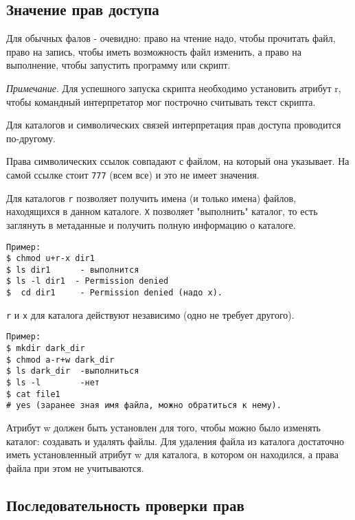 \subsection{Значение прав доступа}

Для обычных фалов - очевидно: право на чтение надо, чтобы прочитать файл, право на запись, чтобы иметь возможность файл изменить, а право на выполнение, чтобы запустить программу или скрипт.

\emph{Примечание}. Для успешного запуска скрипта необходимо установить атрибут r, чтобы командный интерпретатор мог построчно считывать текст скрипта.

Для каталогов и символических связей интерпретация прав доступа проводится по-другому.

Права символических ссылок совпадают с файлом, на который она указывает. На самой ссылке стоит \verb+777+ (всем все) и это не имеет значения. 

Для каталогов \verb+r+ позволяет получить имена (и только имена) файлов, находящихся в данном каталоге. \verb+X+ позволяет "выполнить" каталог, то есть заглянуть в метаданные  и получить полную информацию о каталоге.
\begin{verbatim}
Пример:  
$ chmod u+r-x dir1
$ ls dir1      - выполнится
$ ls -l dir1  - Permission denied
$  cd dir1     - Permission denied (надо х).
\end{verbatim}

\verb+r+ и \verb+x+ для каталога действуют независимо (одно не требует другого).
\begin{verbatim}
Пример:  
$ mkdir dark_dir
$ chmod a-r+w dark_dir
$ ls dark_dir  -выполниться
$ ls -l        -нет  
$ cat file1       
# yes (заранее зная имя файла, можно обратиться к нему).
\end{verbatim}

Атрибут w должен быть установлен для того, чтобы можно было изменять каталог: создавать и удалять файлы.
Для удаления файла из каталога достаточно иметь установленный атрибут w для каталога, в котором он находился, а права файла при этом не учитываются.

\subsection{Последовательность проверки прав}

